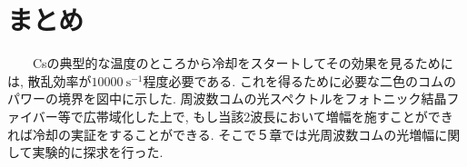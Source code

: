 \documentclass[uplatex, dvipdfmx, a4paper, report, papersize, 11pt]{jsbook}
\begin{document}
\section{まとめ}
　　Csの典型的な温度のところから冷却をスタートしてその効果を見るためには, 散乱効率が$10000\ \mathrm{s^{-1}}$程度必要である. これを得るために必要な二色のコムのパワーの境界を図中に示した. 周波数コムの光スペクトルをフォトニック結晶ファイバー等で広帯域化した上で, もし当該2波長において増幅を施すことができれば冷却の実証をすることができる. そこで５章では光周波数コムの光増幅に関して実験的に探求を行った.

\end{document}
